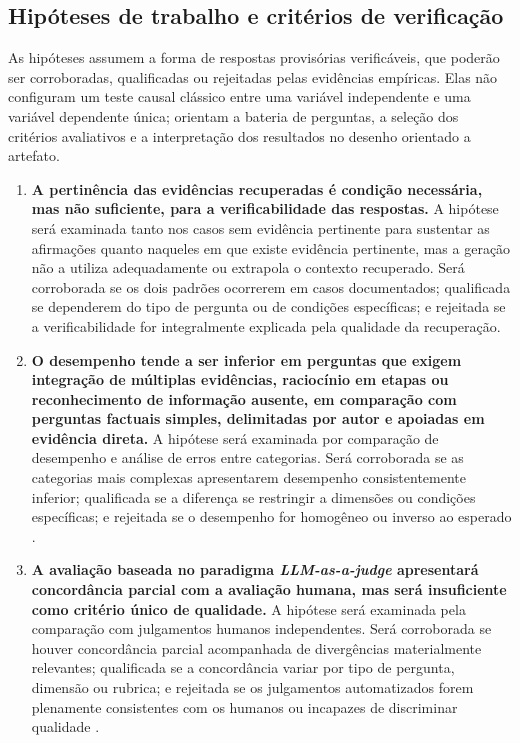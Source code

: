 \subsection{Hipóteses de trabalho e critérios de verificação}

As hipóteses assumem a forma de respostas provisórias verificáveis, que poderão ser corroboradas, qualificadas ou rejeitadas pelas evidências empíricas. Elas não configuram um teste causal clássico entre uma variável independente e uma variável dependente única; orientam a bateria de perguntas, a seleção dos critérios avaliativos e a interpretação dos resultados no desenho orientado a artefato.

\begin{enumerate}[label=\textbf{H\arabic*.}]
  \item \textbf{A pertinência das evidências recuperadas é condição necessária, mas não suficiente, para a verificabilidade das respostas.} A hipótese será examinada tanto nos casos sem evidência pertinente para sustentar as afirmações quanto naqueles em que existe evidência pertinente, mas a geração não a utiliza adequadamente ou extrapola o contexto recuperado. Será corroborada se os dois padrões ocorrerem em casos documentados; qualificada se dependerem do tipo de pergunta ou de condições específicas; e rejeitada se a verificabilidade for integralmente explicada pela qualidade da recuperação.

  \item \textbf{O desempenho tende a ser inferior em perguntas que exigem integração de múltiplas evidências, raciocínio em etapas ou reconhecimento de informação ausente, em comparação com perguntas factuais simples, delimitadas por autor e apoiadas em evidência direta.} A hipótese será examinada por comparação de desempenho e análise de erros entre categorias. Será corroborada se as categorias mais complexas apresentarem desempenho consistentemente inferior; qualificada se a diferença se restringir a dimensões ou condições específicas; e rejeitada se o desempenho for homogêneo ou inverso ao esperado \parencite{saadFalconEtAl2024ares,esEtAl2023ragas,zhuEtAl2025rageval,pipitoneAlami2024legalbenchRag}.

  \item \textbf{A avaliação baseada no paradigma \textit{LLM-as-a-judge} apresentará concordância parcial com a avaliação humana, mas será insuficiente como critério único de qualidade.} A hipótese será examinada pela comparação com julgamentos humanos independentes. Será corroborada se houver concordância parcial acompanhada de divergências materialmente relevantes; qualificada se a concordância variar por tipo de pergunta, dimensão ou rubrica; e rejeitada se os julgamentos automatizados forem plenamente consistentes com os humanos ou incapazes de discriminar qualidade \parencite{liuEtAl2023geval,liuEtAl2025judgeRag}.
\end{enumerate}
